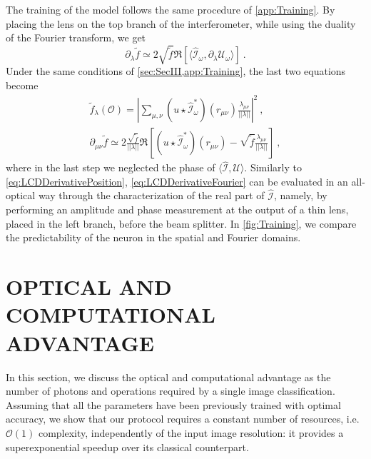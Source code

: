 \documentclass[reprint,
superscriptaddress,
nofootinbib,
aps,
pra,
showkeys
]{revtex4-2}
\newcommand{\I}{\mathcal{I}}
\newcommand{\U}{\mathcal{U}}
\newcommand{\f}{f}
\renewcommand{\O}{\mathcal{O}}
\begin{document}
\begin{widetext}
The training of the model follows the same procedure of \cref{app:Training}. By placing the lens on the top branch of the interferometer, while using the duality of the Fourier transform, we get
\begin{equation}
	\partial_\lambda \widetilde{\f} \simeq 2 \sqrt{\widetilde{\f}} \Re \left[ \langle \hat{\I}_{\omega}, \partial_{\lambda}\U_{\omega} \rangle \right] \ .
	\label{eq:DerivativeApproximationFourier}
\end{equation}
Under the same conditions of \cref{sec:SecIII,app:Training}, the last two equations become
\begin{gather}
	\widetilde{\f}_\lambda(\O) = \left| \sum_{\mu,\nu} (u \star \hat{\I}^*_{\omega})(r_{\mu\nu}) \frac{\lambda_{\mu \nu}}{||\lambda||} \right|^2 
	\label{eq:LCDLayerFourier} \ , \\
	\partial_{\mu \nu} \widetilde{\f} \simeq 2 \frac{\sqrt{\widetilde{\f}}}{||\lambda||}\Re\left[ (u \star  \hat{\I}^*_{\omega})(r_{\mu\nu}) - \sqrt{\widetilde{\f}} \frac{\lambda_{\mu \nu}}{||\lambda||} \right] \  ,
	\label{eq:LCDDerivativeFourier}
\end{gather}
where in the last step we neglected the phase of $\langle \hat{\I},\U \rangle$. Similarly to \cref{eq:LCDDerivativePosition}, \cref{eq:LCDDerivativeFourier} can be evaluated in an all-optical way through the characterization of the real part of $\hat{\I}$, namely, by performing an amplitude and phase measurement at the output of a thin lens, placed in the left branch, before the beam splitter. In \cref{fig:Training}, we compare the predictability of the neuron in the spatial and Fourier domains.

\section{OPTICAL AND COMPUTATIONAL ADVANTAGE\label{app:Advantage}}
In this section, we discuss the optical and computational advantage as the number of photons and operations required by a single image classification. Assuming that all the parameters have been previously trained with optimal accuracy, we show that our protocol requires a constant number of resources, i.e. $\mathcal{O}(1)$ complexity, independently of the input image resolution: it provides a superexponential speedup over its classical counterpart. 


\end{widetext}
\end{document}
